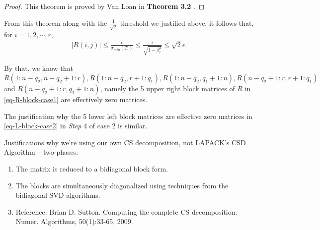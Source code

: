 \begin{remark}
{\begin{proof}
This theorem is proved by Van Loan in \textbf{Theorem 3.2} \cite[pp.~484--485]{vanloan85}.
\end{proof}

From this theorem along with the $\frac{1}{\sqrt{2}}$ threshold we justified above, it follows that, for $i = 1, 2, \cdots, r$, 
\begin{align*}
	\left|R(i, j)\right| \leq \frac{\epsilon}{\sigma_{min}(T_{i})} \leq \frac{\epsilon}{\sqrt{1-\beta_{r}^{2}}} \leq \sqrt{2}\epsilon.
\end{align*}

By that, we know that $R(1:n-q_{2},n-q_{2}+1:r), R(1:n-q_{2},r+1:q_{1}), R(1:n-q_{2},q_{1}+1:n), R(n-q_{2}+1:r,r+1:q_{1})$ and $R(n-q_{2}+1:r,q_{1}+1:n)$, namely the 5 upper right block matrices of $R$ in \eqref{eq-R-block-case1} are effectively zero matrices. 

The justification why the 5 lower left block matrices are effective zero matrices in \eqref{eq-L-block-case2} in \textit{Step} 4 of case 2 is similar. 
}

\end{remark}

\begin{remark}
{\rm 
Justifications why we're using our own CS decomposition, not 
LAPACK's CSD Algorithm -- two-phases: 
\begin{enumerate} 
\item 
The matrix is reduced to a bidiagonal block form.

\item 
The blocks are simultaneously diagonalized using techniques 
from the bidiagonal SVD algorithms.

\item Reference: 
Brian D. Sutton. 
Computing the complete CS decomposition. 
Numer. Algorithms, 50(1):33-65, 2009.
\end{enumerate} 
}
\end{remark} 

